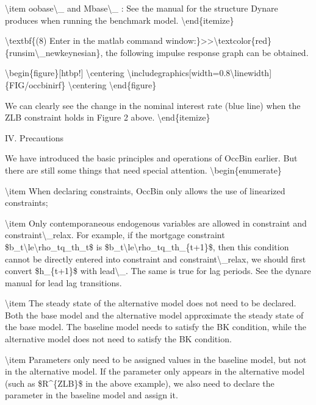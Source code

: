 \documentclass[10pt,math=newtx,citestyle=gb7714-2015,bibstyle=gb7714-2015]{elegantbook}
\begin{document}
	\textbackslash{}item oobase\textbackslash{}\_ and Mbase\textbackslash{}\_ : See the manual for the structure Dynare produces when running the benchmark model.
	\textbackslash{}end\{itemize\}
	
	\textbackslash{}textbf\{(8) Enter in the matlab command window:\}>>\textbackslash{}textcolor\{red\}\{runsim\textbackslash{}\_newkeynesian\}, the following impulse response graph can be obtained.
	
	
	\textbackslash{}begin\{figure\}[htbp!]
	\textbackslash{}centering
	\textbackslash{}includegraphics[width=0.8\textbackslash{}linewidth]\{FIG/occbinirf\}
	\textbackslash{}centering
	\textbackslash{}end\{figure\}
	
	We can clearly see the change in the nominal interest rate (blue line) when the ZLB constraint holds in Figure 2 above.
	\textbackslash{}end\{itemize\}
	
	IV. Precautions
	
	We have introduced the basic principles and operations of OccBin earlier. But there are still some things that need special attention.
	\textbackslash{}begin\{enumerate\}
	
	\textbackslash{}item When declaring constraints, OccBin only allows the use of linearized constraints;
	
	\textbackslash{}item Only contemporaneous endogenous variables are allowed in constraint and constraint\textbackslash{}\_relax. For example, if the mortgage constraint \$b\_t\textbackslash{}le\textbackslash{}rho\_tq\_th\_t\$ is \$b\_t\textbackslash{}le\textbackslash{}rho\_tq\_th\_\{t+1\}\$, then this condition cannot be directly entered into constraint and constraint\textbackslash{}\_relax, we should first convert \$h\_\{t+1\}\$ with lead\textbackslash{}\_. The same is true for lag periods. See the dynare manual for lead lag transitions.
	
	\textbackslash{}item The steady state of the alternative model does not need to be declared. Both the base model and the alternative model approximate the steady state of the base model. The baseline model needs to satisfy the BK condition, while the alternative model does not need to satisfy the BK condition.
	
	\textbackslash{}item Parameters only need to be assigned values in the baseline model, but not in the alternative model. If the parameter only appears in the alternative model (such as \$R\^{}\{ZLB\}\$ in the above example), we also need to declare the parameter in the baseline model and assign it.
	
\end{document}
